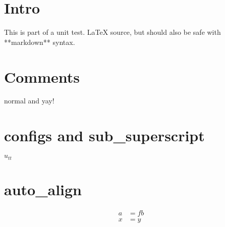 \documentclass[12pt]{article}
\begin{document}
\section{Intro}
This is part of a unit test. \LaTeX{} source, but should also be safe with **markdown** syntax.

\section{Comments}
normal %
and
yay!

\section{configs and sub_superscript}
$u_{tt}$

\section{auto_align}
\begin {align}
a &= fb \\
x &= y
\end{align}
\end{document}
